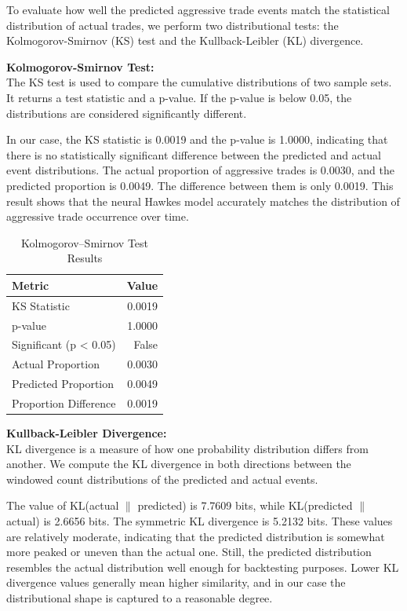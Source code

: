 To evaluate how well the predicted aggressive trade events match the statistical distribution of actual trades, we perform two distributional tests: the Kolmogorov-Smirnov (KS) test and the Kullback-Leibler (KL) divergence.

\vspace{0.5em}
\noindent\textbf{Kolmogorov-Smirnov Test:} \\
The KS test is used to compare the cumulative distributions of two sample sets. It returns a test statistic and a p-value. If the p-value is below 0.05, the distributions are considered significantly different.

In our case, the KS statistic is 0.0019 and the p-value is 1.0000, indicating that there is no statistically significant difference between the predicted and actual event distributions. The actual proportion of aggressive trades is 0.0030, and the predicted proportion is 0.0049. The difference between them is only 0.0019. This result shows that the neural Hawkes model accurately matches the distribution of aggressive trade occurrence over time.
\begin{table}[H]
    \centering
    \caption{Kolmogorov--Smirnov Test Results}
    \label{tb:ks-test}
    \begin{tabular}{lr}
    \toprule
    \textbf{Metric} & \textbf{Value} \\
    \midrule
    KS Statistic & 0.0019 \\
    p-value & 1.0000 \\
    Significant (p < 0.05) & False \\
    Actual Proportion & 0.0030 \\
    Predicted Proportion & 0.0049 \\
    Proportion Difference & 0.0019 \\
    \bottomrule
    \end{tabular}
\end{table}

\vspace{0.5em}
\noindent\textbf{Kullback-Leibler Divergence:} \\
KL divergence is a measure of how one probability distribution differs from another. We compute the KL divergence in both directions between the windowed count distributions of the predicted and actual events. 

The value of KL(actual $\parallel$ predicted) is 7.7609 bits, while KL(predicted $\parallel$ actual) is 2.6656 bits. The symmetric KL divergence is 5.2132 bits. These values are relatively moderate, indicating that the predicted distribution is somewhat more peaked or uneven than the actual one. Still, the predicted distribution resembles the actual distribution well enough for backtesting purposes. Lower KL divergence values generally mean higher similarity, and in our case the distributional shape is captured to a reasonable degree.

